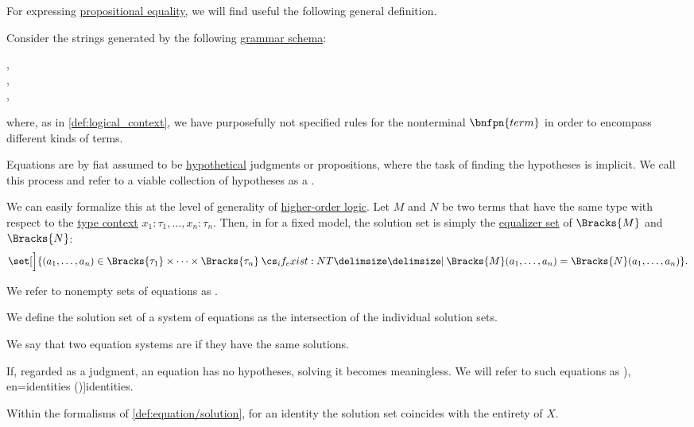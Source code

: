 \begin{definition}\label{def:equation}\mimprovised
  For expressing \hyperref[con:equality]{propositional equality}, we will find useful the following general definition.

  Consider the strings generated by the following \hyperref[def:formal_grammar/schema]{grammar schema}:
  \begin{bnf*}
      {}, \\
     {}, \\
       { \bnfsp \bnftsq{\( \syneq \)} \bnfsp {}},
  \end{bnf*}
  where, as in \cref{def:logical_context}, we have purposefully not specified rules for the nonterminal \( \bnfpn{term} \) in order to encompass different kinds of terms.

  \begin{thmenum}
     Equations are by fiat assumed to be \hyperref[con:hypothetical_judgment]{hypothetical} judgments or propositions, where the task of finding the hypotheses is implicit. We call this process  and refer to a viable collection of hypotheses as a .

    We can easily formalize this at the level of generality of \hyperref[def:simply_typed_hol]{higher-order logic}. Let \( M \) and \( N \) be two terms that have the same type with respect to the \hyperref[def:type_context]{type context} \( x_1: \tau_1, \ldots, x_n: \tau_n \). Then, in for a fixed model, the solution set is simply the \hyperref[def:equalizers]{equalizer set} of \( \Bracks{M} \) and \( \Bracks{N} \):
    \begin{equation}\label{eq:def:equation/solution}
      \set[\Big]{ (a_1, \ldots, a_n) \in \Bracks{\tau_1} \times \cdots \times \Bracks{\tau_n} \given* \Bracks{M}(a_1, \ldots, a_n) = \Bracks{N}(a_1, \ldots, a_n) }.
    \end{equation}

     We refer to nonempty sets of equations as .

    We define the solution set of a system of equations as the intersection of the individual solution sets.

     We say that two equation systems are  if they have the same solutions.

     If, regarded as a judgment, an equation has no hypotheses, solving it becomes meaningless. We will refer to such equations as \term[bg=тъждества (\cite[2]{Обрешков1962ВисшаАлгебра}), en=identities (\cite[50]{BaaderNipkow2012TermRewriting})]{identities}.

    Within the formalisms of \cref{def:equation/solution}, for an identity the solution set coincides with the entirety of \( X \).
  \end{thmenum}
\end{definition}
